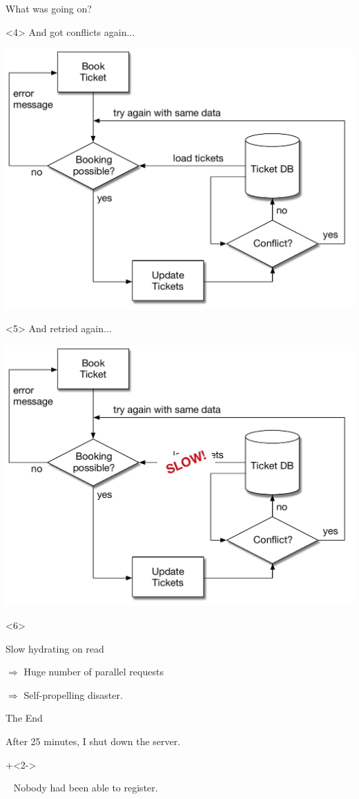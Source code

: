 \begin{frame}[fragile]{What was going on?}
\begin{center}
\begin{onlyenv}<4>
And got conflicts again...
\vspace{\SPACE}

\includegraphics[width=.6\textwidth]{../OptimisticLocking7.pdf}
\end{onlyenv}

\begin{onlyenv}<5>
And retried again...
\vspace{\SPACE}

\includegraphics[width=.6\textwidth]{../OptimisticLocking8.pdf}
\end{onlyenv}

\begin{onlyenv}<6>
\renewcommand{\SPACE}{3em}

Slow hydrating on read
\vspace{\SPACE}

$\Longrightarrow$ Huge number of parallel requests
\vspace{\SPACE}

$\Longrightarrow$ Self-propelling disaster.
\end{onlyenv}

\end{center}

\end{frame}

\begin{frame}[fragile]{The End}

After 25 minutes, I shut down the server.
                  
\onslide+<2->
                  
\vspace{3em}

~ \hspace{10em} Nobody had been able to register.
                  
\end{frame}

